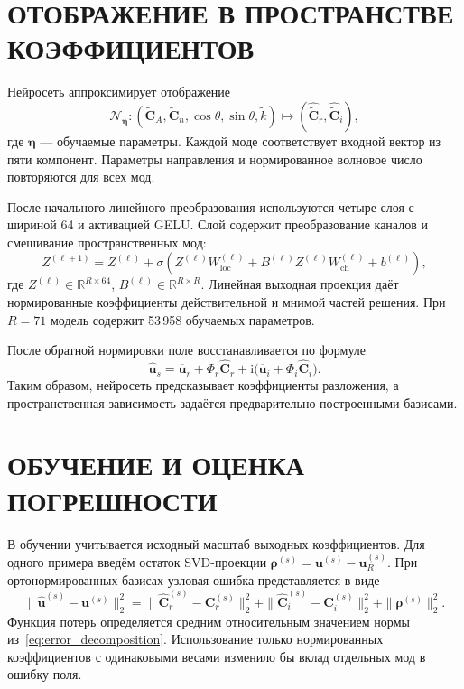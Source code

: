 \documentclass[notitle]{sibjima_preview}
\newcommand{\ii}{\mathrm{i}}
\newcommand{\R}{\mathbb{R}}
\begin{document}
\section{ОТОБРАЖЕНИЕ В ПРОСТРАНСТВЕ КОЭФФИЦИЕНТОВ}
Нейросеть аппроксимирует отображение
\begin{equation*}
\mathcal{N}_{\bm{\eta}}:
(\widetilde{\bm{C}}_A,\widetilde{\bm{C}}_n,\cos\theta,\sin\theta,\widetilde{k})
\longmapsto
(\widehat{\widetilde{\bm{C}}}_{r},\widehat{\widetilde{\bm{C}}}_{i}),
\end{equation*}
где \(\bm{\eta}\) --- обучаемые параметры. Каждой моде соответствует входной вектор из пяти компонент. Параметры направления и нормированное волновое число повторяются для всех мод.

После начального линейного преобразования используются четыре слоя с шириной 64 и активацией GELU. Слой содержит преобразование каналов и смешивание пространственных мод:
\begin{equation*}
Z^{(\ell+1)}
=
Z^{(\ell)}
+\sigma\!\left(
Z^{(\ell)}W_{\mathrm{loc}}^{(\ell)}
+B^{(\ell)}Z^{(\ell)}W_{\mathrm{ch}}^{(\ell)}
+b^{(\ell)}\right),
\end{equation*}
где \(Z^{(\ell)}\in\R^{R\times64}\),
\(B^{(\ell)}\in\R^{R\times R}\).
Линейная выходная проекция даёт нормированные коэффициенты действительной и мнимой частей решения. При \(R=71\) модель содержит 53\,958 обучаемых параметров.

После обратной нормировки поле восстанавливается по формуле
\begin{equation*}
\widehat{\bm{u}}_s=
\overline{\bm{u}}_r+\Phi_r\widehat{\bm{C}}_r
+\ii\bigl(\overline{\bm{u}}_i+\Phi_i\widehat{\bm{C}}_i\bigr).
\end{equation*}
Таким образом, нейросеть предсказывает коэффициенты разложения, а пространственная зависимость задаётся предварительно построенными базисами.

\section{ОБУЧЕНИЕ И ОЦЕНКА ПОГРЕШНОСТИ}
В обучении учитывается исходный масштаб выходных коэффициентов. Для одного примера введём остаток SVD-проекции
\(\bm{\rho}^{(s)}=\bm{u}^{(s)}-\bm{u}_R^{(s)}\).
При ортонормированных базисах узловая ошибка представляется в виде
\begin{equation}
\|\widehat{\bm{u}}^{(s)}-\bm{u}^{(s)}\|_2^2
=
\|\widehat{\bm{C}}_r^{(s)}-\bm{C}_r^{(s)}\|_2^2
+\|\widehat{\bm{C}}_i^{(s)}-\bm{C}_i^{(s)}\|_2^2
+\|\bm{\rho}^{(s)}\|_2^2.
\tag{5}\label{eq:error_decomposition}
\end{equation}
Функция потерь определяется средним относительным значением нормы из~\eqref{eq:error_decomposition}. Использование только нормированных коэффициентов с одинаковыми весами изменило бы вклад отдельных мод в ошибку поля.
\end{document}
